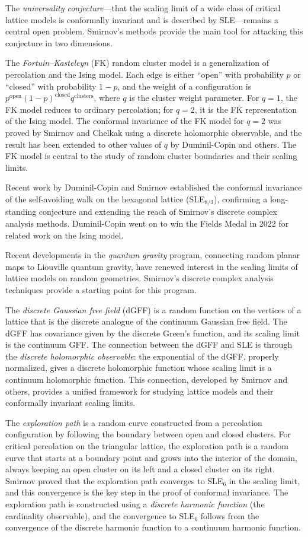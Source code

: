 The \emph{universality conjecture}---that the scaling limit of a wide class of critical lattice models is conformally invariant and is described by SLE---remains a central open problem. Smirnov's methods provide the main tool for attacking this conjecture in two dimensions.

The \emph{Fortuin--Kasteleyn} (FK) random cluster model is a generalization of percolation and the Ising model. Each edge is either ``open'' with probability $p$ or ``closed'' with probability $1-p$, and the weight of a configuration is $p^{\text{open}} (1-p)^{\text{closed}} q^{\text{clusters}}$, where $q$ is the cluster weight parameter. For $q=1$, the FK model reduces to ordinary percolation; for $q=2$, it is the FK representation of the Ising model. The conformal invariance of the FK model for $q=2$ was proved by Smirnov and Chelkak using a discrete holomorphic observable, and the result has been extended to other values of $q$ by Duminil-Copin and others. The FK model is central to the study of random cluster boundaries and their scaling limits.

Recent work by Duminil-Copin and Smirnov established the conformal invariance of the self-avoiding walk on the hexagonal lattice (SLE$_{8/3}$), confirming a long-standing conjecture and extending the reach of Smirnov's discrete complex analysis methods. Duminil-Copin went on to win the Fields Medal in 2022 for related work on the Ising model.

Recent developments in the \emph{quantum gravity} program, connecting random planar maps to Liouville quantum gravity, have renewed interest in the scaling limits of lattice models on random geometries. Smirnov's discrete complex analysis techniques provide a starting point for this program.

The \emph{discrete Gaussian free field} (dGFF) is a random function on the vertices of a lattice that is the discrete analogue of the continuum Gaussian free field. The dGFF has covariance given by the discrete Green's function, and its scaling limit is the continuum GFF. The connection between the dGFF and SLE is through the \emph{discrete holomorphic observable}: the exponential of the dGFF, properly normalized, gives a discrete holomorphic function whose scaling limit is a continuum holomorphic function. This connection, developed by Smirnov and others, provides a unified framework for studying lattice models and their conformally invariant scaling limits.

The \emph{exploration path} is a random curve constructed from a percolation configuration by following the boundary between open and closed clusters. For critical percolation on the triangular lattice, the exploration path is a random curve that starts at a boundary point and grows into the interior of the domain, always keeping an open cluster on its left and a closed cluster on its right. Smirnov proved that the exploration path converges to SLE$_6$ in the scaling limit, and this convergence is the key step in the proof of conformal invariance. The exploration path is constructed using a \emph{discrete harmonic function} (the cardinality observable), and the convergence to SLE$_6$ follows from the convergence of the discrete harmonic function to a continuum harmonic function.

